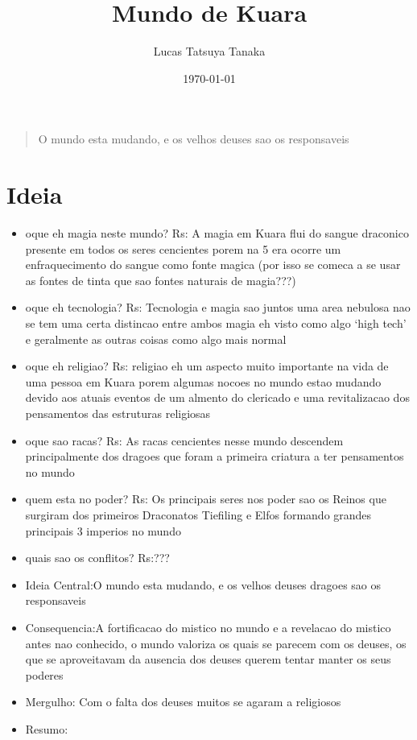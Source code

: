 \documentclass{book}
\title{Mundo de Kuara}
\author{Lucas Tatsuya Tanaka}
\date{\today}
\begin{document}
\maketitle
\tableofcontents

\chapter*{}
\vspace*{\fill} 
\begin{quote} 
\centering 
\Large O mundo esta mudando, e os velhos deuses sao os responsaveis
\end{quote}
\vspace*{\fill}

\part{Ideia}
\begin{itemize}
    \item oque eh magia neste mundo?
        Rs: A magia em Kuara flui do sangue draconico presente em todos os seres cencientes 
        porem na 5 era ocorre um enfraquecimento do sangue como fonte magica (por isso 
        se comeca a se usar as fontes de tinta que sao fontes naturais de magia???) 
    \item oque eh tecnologia?
        Rs: Tecnologia e magia sao juntos uma area nebulosa nao se tem uma certa distincao 
        entre ambos magia eh visto como algo `high tech' e geralmente as outras coisas como
        algo mais normal
    \item oque eh religiao?
        Rs: religiao eh um aspecto muito importante na vida de uma pessoa em Kuara porem 
        algumas nocoes no mundo estao mudando devido aos atuais eventos de um almento 
        do clericado e uma revitalizacao dos pensamentos das estruturas religiosas 
    \item oque sao racas?
        Rs: As racas cencientes nesse mundo descendem principalmente dos dragoes que foram
        a primeira criatura a ter pensamentos no mundo 
    \item quem esta no poder?
        Rs: Os principais seres nos poder sao os Reinos que surgiram dos primeiros Draconatos
        Tiefiling e Elfos formando grandes principais 3 imperios no mundo 
    \item quais sao os conflitos?
        Rs:???
\end{itemize}
\begin{itemize}
    \item Ideia Central:O mundo esta mudando, e os velhos deuses dragoes sao os responsaveis
    \item Consequencia:A fortificacao do mistico no mundo e a revelacao do mistico antes nao 
        conhecido, o mundo valoriza os quais se parecem com os deuses, os que se aproveitavam 
        da ausencia dos deuses querem tentar manter os seus poderes 
    \item Mergulho: Com o falta dos deuses muitos se agaram a religiosos 
    \item Resumo:
\end{itemize}
\end{document}
